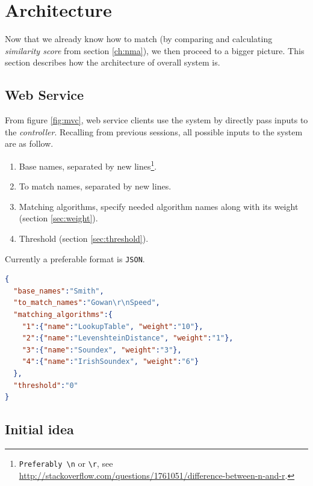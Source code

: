 \chapter{Architecture}
\label{ch:architecture}

Now that we already know how to match (by comparing and calculating
\emph{similarity score} from section \ref{ch:nma}), we then proceed
to a bigger picture. This section describes how the architecture
of overall system is.

\section{Web Service}
\label{sec:ws}

From figure \ref{fig:mvc}, web service clients use the system
by directly pass inputs to the \emph{controller}. Recalling
from previous sessions, all possible inputs to the system
are as follow.

\begin{enumerate}
  \item Base names, separated by
        new lines\footnote{\texttt{Preferably \textbackslash n} or \texttt{\textbackslash r}, see \url{http://stackoverflow.com/questions/1761051/difference-between-n-and-r}.}.
  \item To match names, separated by new lines.
  \item Matching algorithms, specify needed algorithm names along with its weight (section \ref{sec:weight}).
  \item Threshold (section \ref{sec:threshold}).
\end{enumerate}

Currently a preferable format is \texttt{JSON}.

\begin{minipage}{\linewidth}
\begin{lstlisting}[language={json}, label={lst:json}, caption={\texttt{JSON}.}]
{
  "base_names":"Smith",
  "to_match_names":"Gowan\r\nSpeed",
  "matching_algorithms":{
    "1":{"name":"LookupTable", "weight":"10"},
    "2":{"name":"LevenshteinDistance", "weight":"1"},
    "3":{"name":"Soundex", "weight":"3"},
    "4":{"name":"IrishSoundex", "weight":"6"}
  },
  "threshold":"0"
}
\end{lstlisting}
\end{minipage}

\section{Initial idea}
\label{sec:initialidea}

